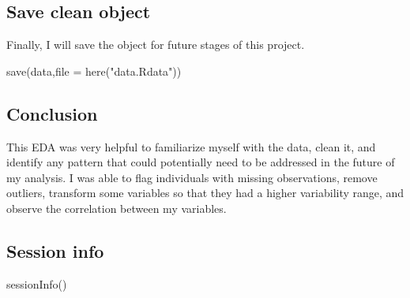 \documentclass[
]{article}
\newenvironment{Shaded}{\begin{snugshade}}{\end{snugshade}}
\newcommand{\AttributeTok}[1]{\textcolor[rgb]{0.77,0.63,0.00}{#1}}
\newcommand{\FunctionTok}[1]{\textcolor[rgb]{0.00,0.00,0.00}{#1}}
\newcommand{\NormalTok}[1]{#1}
\newcommand{\StringTok}[1]{\textcolor[rgb]{0.31,0.60,0.02}{#1}}
\begin{document}
\hypertarget{save-clean-object}{%
\subsection{Save clean object}\label{save-clean-object}}

Finally, I will save the object for future stages of this project.

\begin{Shaded}
\begin{Highlighting}[]
\FunctionTok{save}\NormalTok{(data,}\AttributeTok{file =}  \FunctionTok{here}\NormalTok{(}\StringTok{"data.Rdata"}\NormalTok{))}
\end{Highlighting}
\end{Shaded}

\hypertarget{conclusion}{%
\subsection{Conclusion}\label{conclusion}}

This EDA was very helpful to familiarize myself with the data, clean it,
and identify any pattern that could potentially need to be addressed in
the future of my analysis. I was able to flag individuals with missing
observations, remove outliers, transform some variables so that they had
a higher variability range, and observe the correlation between my
variables.

\hypertarget{session-info}{%
\subsection{Session info}\label{session-info}}

\begin{Shaded}
\begin{Highlighting}[]
\FunctionTok{sessionInfo}\NormalTok{()}
\end{Highlighting}
\end{Shaded}
\end{document}
